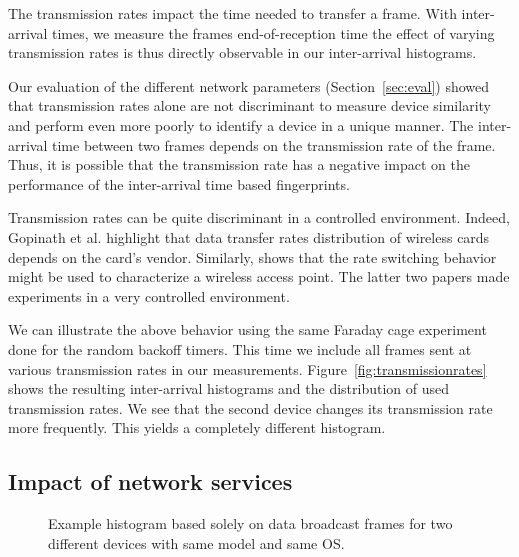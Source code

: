 \documentclass[10pt, conference, compsocconf, letterpaper]{IEEEtran}
\begin{document}
The transmission rates impact the time needed to transfer a frame. With inter-arrival times, we measure the frames end-of-reception time 
the effect of varying transmission rates is thus directly observable in our inter-arrival histograms. 

Our evaluation of the different network parameters (Section~\ref{sec:eval}) showed that transmission rates alone 
are not discriminant to measure device similarity and perform even more poorly to identify a device in a unique manner.
The inter-arrival time between two frames depends on the transmission rate of the frame. Thus, it is possible that the transmission rate has a negative impact on the performance of the inter-arrival time based fingerprints. 


Transmission rates can be quite discriminant in a controlled environment. Indeed, 
Gopinath et al. \cite{Gopinath:WiNTECH} highlight that data transfer rates distribution of wireless cards depends on the card's vendor. 
Similarly, \cite{conf/dsn/GaoCB10} shows that the rate switching behavior might be used to characterize a wireless access point.
The latter two papers made experiments in a very controlled environment.


We can illustrate the above behavior using the same Faraday cage experiment 
done for the random backoff timers. This time we include
all frames sent at various transmission rates in our measurements.
Figure~\ref{fig:transmissionrates} shows the resulting inter-arrival histograms and the distribution of used transmission rates.
We see that the second device changes its transmission rate more frequently. This yields a completely different histogram.























\subsection{Impact of network services}

\begin{figure}
\begin{center}
\caption{Example histogram based solely on data broadcast frames for two different devices with same model and same OS.}
\label{fig:applicative_peaks}
\end{center}
\end{figure}
\end{document}
